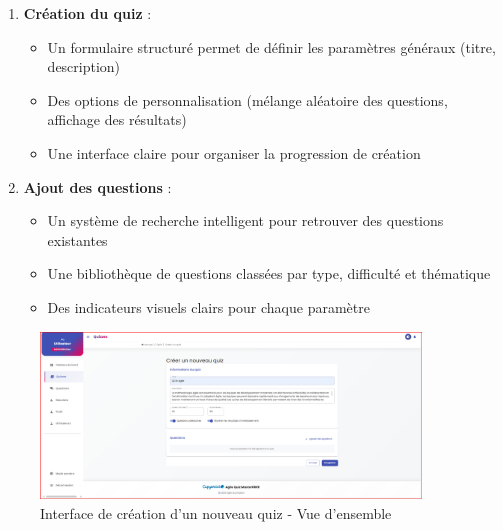 \documentclass[12pt,a4paper]{report}
\begin{document}
\begin{enumerate}
\item \textbf{Création du quiz} :
   \begin{itemize}
   \item Un formulaire structuré permet de définir les paramètres généraux (titre, description)
   \item Des options de personnalisation (mélange aléatoire des questions, affichage des résultats)
   \item Une interface claire pour organiser la progression de création
   \end{itemize}

\item \textbf{Ajout des questions} :
   \begin{itemize}
   \item Un système de recherche intelligent pour retrouver des questions existantes
   \item Une bibliothèque de questions classées par type, difficulté et thématique
   \item Des indicateurs visuels clairs pour chaque paramètre
   \end{itemize}
\end{enumerate}

\begin{figure}[H]
\centering
\includegraphics[width=0.9\textwidth]{latex_media/media/image56.png}
\caption{Interface de création d'un nouveau quiz - Vue d'ensemble}
\label{fig:creation-quiz-overview}
\end{figure}
\end{document}

